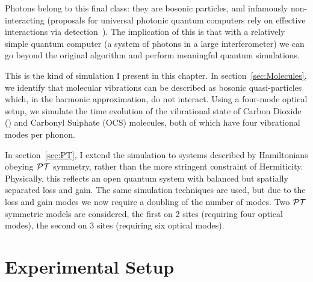 Photons belong to this final class: they are bosonic particles, and infamously
non-interacting (proposals for universal photonic quantum computers rely on
effective interactions via detection~\cite{klm}). The implication of this is
that with a relatively simple quantum computer (a system of photons in a large
interferometer) we can go beyond the original \bosonsampling{} algorithm and
perform meaningful quantum simulations.

This is the kind of simulation I present in this chapter. In
section~\ref{sec:Molecules}, we identify that molecular vibrations can be
described as bosonic quasi-particles which, in the harmonic approximation, do
not interact. Using a four-mode optical setup, we simulate the time evolution
of the vibrational state of Carbon Dioxide (\co) and Carbonyl Sulphate (OCS)
molecules, both of which have four vibrational modes per phonon.

In section~\ref{sec:PT}, I extend the simulation to systems described by
Hamiltonians obeying \(\mathcal{PT}\) symmetry, rather than the more stringent
constraint of Hermiticity. Physically, this reflects an open quantum system
with balanced but spatially separated loss and gain. The same simulation
techniques are used, but due to the loss and gain modes we now require a
doubling of the number of modes. Two \(\mathcal{PT}\) symmetric models are considered,
the first on 2 sites (requiring four optical modes), the second on 3 sites
(requiring six optical modes).

\section{Experimental Setup}
